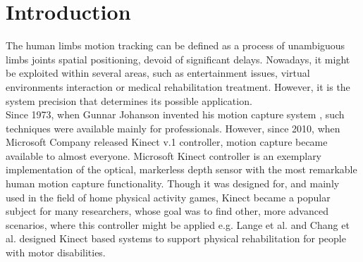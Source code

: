 \documentclass[sensors,article,submit,moreauthors,pdftex,10pt,a4paper]{mdpi}
\begin{document}


\section{Introduction}

The human limbs motion tracking can be defined as a process of unambiguous limbs joints spatial positioning, devoid of significant delays. Nowadays, it might be exploited within several areas, such as entertainment issues, virtual environments interaction or medical rehabilitation treatment. However, it is the system precision that determines its possible application. \\
Since 1973, when Gunnar Johanson invented his motion capture system \cite{Johansson1973}, such techniques were available mainly for professionals. However, since 2010, when Microsoft Company released Kinect v.1 controller, motion capture became available to almost everyone. Microsoft Kinect controller is an exemplary implementation of the optical, markerless depth sensor with the most remarkable human motion capture functionality. Though it was designed for, and mainly used in the field of home physical activity games, Kinect became a popular subject for many researchers, whose goal was to find other, more advanced scenarios, where this controller might be applied e.g. Lange et al. \cite{Lange2012} and Chang et al.\cite{Chang2011} designed Kinect based systems to support physical rehabilitation for people with motor disabilities. 
\end{document}

